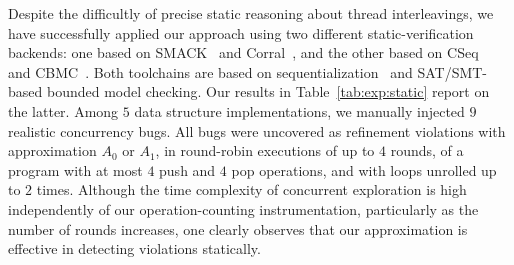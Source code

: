 Despite the difficultly of precise static reasoning about thread interleavings,
we have successfully applied our approach using two different
static-verification backends: one based on SMACK~\cite{conf/cav/RakamaricE14}
and Corral~\cite{conf/cav/LalQL12}, and the other based on
CSeq~\cite{conf/ase/FischerIP13} and CBMC~\cite{conf/tacas/KroeningT14}. Both
toolchains are based on sequentialization~\cite{journals/fmsd/LalR09} and
SAT/SMT-based bounded model checking. Our results in Table~\ref{tab:exp:static}
report on the latter. Among $5$ data structure implementations, we manually
injected $9$ realistic concurrency bugs. All bugs were uncovered as refinement
violations with approximation $A_0$ or $A_1$, in round-robin executions of up
to $4$ rounds, of a program with at most $4$ {\sf push} and $4$ {\sf pop}
operations, and with loops unrolled up to $2$ times. Although the time
complexity of concurrent exploration is high independently of our
operation-counting instrumentation, particularly as the number of rounds
increases, one clearly observes that our approximation is effective in
detecting violations statically.


